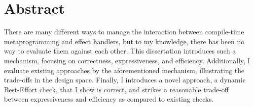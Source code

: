 \chapter*{Abstract}
There are many different ways to manage the interaction between compile-time metaprogramming and effect handlers, but to my knowledge, there has been no way to evaluate them against each other. This dissertation introduces such a mechanism, focusing on correctness, expressiveness, and efficiency. Additionally, I evaluate existing approaches by the aforementioned mechanism, illustrating the trade-offs in the design space. Finally, I introduces a novel approach, a dynamic Best-Effort check, that I show is correct, and strikes a reasonable trade-off between expressiveness and efficiency as compared to existing checks. 